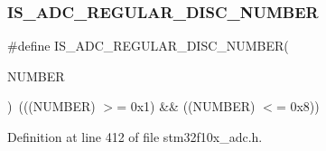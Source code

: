 \subsubsection{\texorpdfstring{I\+S\+\_\+\+A\+D\+C\+\_\+\+R\+E\+G\+U\+L\+A\+R\+\_\+\+D\+I\+S\+C\+\_\+\+N\+U\+M\+B\+ER}{IS\_ADC\_REGULAR\_DISC\_NUMBER}}
{\footnotesize\ttfamily \#define I\+S\+\_\+\+A\+D\+C\+\_\+\+R\+E\+G\+U\+L\+A\+R\+\_\+\+D\+I\+S\+C\+\_\+\+N\+U\+M\+B\+ER(\begin{DoxyParamCaption}\item[{}]{N\+U\+M\+B\+ER }\end{DoxyParamCaption})~(((N\+U\+M\+B\+ER) $>$= 0x1) \&\& ((\+N\+U\+M\+B\+E\+R) $<$= 0x8))}



Definition at line 412 of file stm32f10x\+\_\+adc.\+h.

